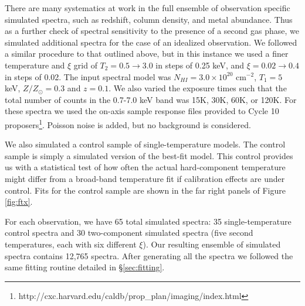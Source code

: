 \documentclass[12pt,preprint]{aastex}
\begin{document}
There are many systematics at work in the full ensemble of observation
specific simulated spectra, such as redshift, column density, and
metal abundance. Thus as a further check of spectral sensitivity to
the presence of a second gas phase, we simulated additional spectra
for the case of an idealized observation. We followed a similar
procedure to that outlined above, but in this instance we used a finer
temperature and $\xi$ grid of $T_2 = 0.5 \rightarrow 3.0$ in steps of
0.25 keV, and $\xi = 0.02 \rightarrow 0.4$ in steps of 0.02. The
input spectral model was $N_{HI} = 3.0\times10^{20}$ cm$^{-2}$, $T_1 = 5$
keV, $Z/Z_{\odot} = 0.3$ and $z = 0.1$. We also varied the exposure
times such that the total number of counts in the 0.7-7.0 keV band was
15K, 30K, 60K, or 120K. For these spectra we used the on-axis sample
response files provided to Cycle 10
proposers\footnote{http://cxc.harvard.edu/caldb/prop\_plan/imaging/index.html}.
Poisson noise is added, but no background is considered.

We also simulated a control sample of single-temperature models. The
control sample is simply a simulated version of the best-fit
model. This control provides us with a statistical test of how often
the actual hard-component temperature might differ from a broad-band
temperature fit if calibration effects are under control. Fits for the
control sample are shown in the far right panels of Figure
\ref{fig:ftx}.

For each observation, we have 65 total simulated spectra: 35
single-temperature control spectra and 30 two-component simulated
spectra (five second temperatures, each with six different $\xi$). Our
resulting ensemble of simulated spectra contains 12,765 spectra. After
generating all the spectra we followed the same fitting routine
detailed in \S\ref{sec:fitting}.
\end{document}
